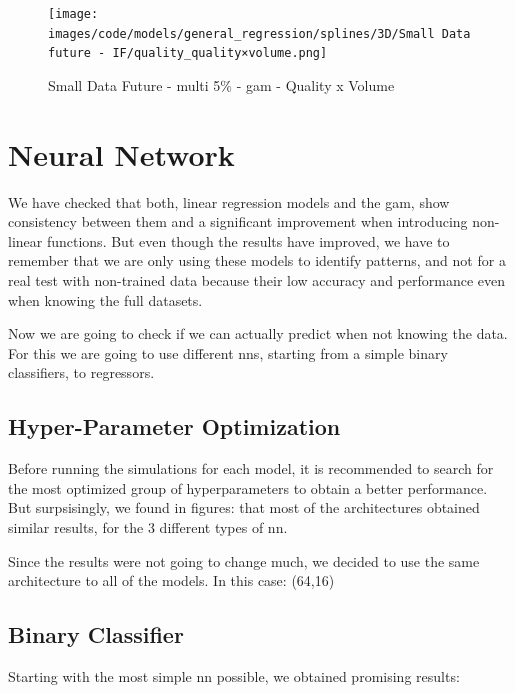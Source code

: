 \documentclass[11pt,english,a4paper,hidelinks]{book}
\begin{document}
\begin{figure}[H]
    \centering
    \texttt{[image: images/code/models/general\_regression/splines/3D/Small Data future - IF/quality\_quality×volume.png]}
    \caption{Small Data Future - \acrshort{multi} 5\% - \acrshort{gam} - Quality x Volume}
    \label{fig:gam_quality_volume}
\end{figure}



\section{Neural Network}

We have checked that both, linear regression models and the \acrshort{gam}, show consistency between them and a significant improvement when introducing non-linear functions. But even though the results have improved, we have to remember that we are only using these models to identify patterns, and not for a real test with non-trained data because their low accuracy and performance even when knowing the full datasets.

\vspace{0.5cm}

\noindent Now we are going to check if we can actually predict when not knowing the data. For this we are going to use different \acrshort{nn}s, starting from a simple binary classifiers, to regressors.

\subsection{Hyper-Parameter Optimization}

Before running the simulations for each model, it is recommended to search for the most optimized group of hyperparameters to obtain a better performance. But surpsisingly, we found in figures: that most of the architectures obtained similar results, for the 3 different types of \acrshort{nn}. %

\noindent Since the results were not going to change much, we decided to use the same architecture to all of the models. In this case: (64,16) %

\subsection{Binary Classifier}

Starting with the most simple \acrshort{nn} possible, we obtained promising results:
\end{document}
